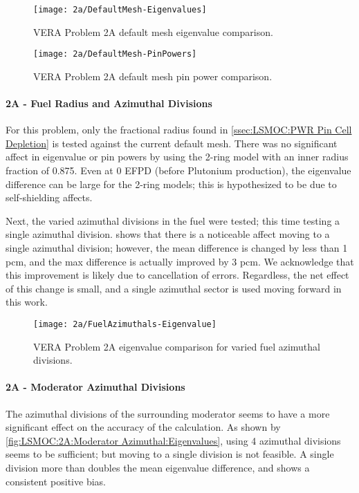 {{{{{          \begin{figure}
            \centering
            \texttt{[image: 2a/DefaultMesh-Eigenvalues]}
            \caption{VERA Problem 2A default mesh eigenvalue comparison. \label{fig:LSMOC:2A:Default Mesh:Eigenvalues}}
          \end{figure}
          \begin{figure}
            \centering
            \texttt{[image: 2a/DefaultMesh-PinPowers]}
            \caption{VERA Problem 2A default mesh pin power comparison. \label{fig:LSMOC:2A:Default Mesh:PinPowers}}
          \end{figure}
        }
        \paragraph{2A - Fuel Radius and Azimuthal Divisions}{
          For this problem, only the fractional radius found in \cref{ssec:LSMOC:PWR Pin Cell Depletion} is tested against the current default mesh.
          There was no significant affect in eigenvalue or pin powers by using the 2-ring model with an inner radius fraction of 0.875.
          Even at 0 \ac{EFPD} (before Plutonium production), the eigenvalue difference can be large for the 2-ring models; this is hypothesized to be due to self-shielding affects.

          Next, the varied azimuthal divisions in the fuel were tested; this time testing a single azimuthal division.
           shows that there is a noticeable affect moving to a single azimuthal division;
            however, the mean difference is changed by less than 1 \ac{pcm}, and the max difference is actually improved by 3 \ac{pcm}.
          We acknowledge that this improvement is likely due to cancellation of errors.
          Regardless, the net effect of this change is small, and a single azimuthal sector is used moving forward in this work.

          \begin{figure}
            \centering
            \texttt{[image: 2a/FuelAzimuthals-Eigenvalue]}
            \caption{VERA Problem 2A eigenvalue comparison for varied fuel azimuthal divisions. \label{fig:LSMOC:2A:Fuel Azimuthals:Eigenvalues}}
          \end{figure}
        }
        \paragraph{2A - Moderator Azimuthal Divisions}{
          The azimuthal divisions of the surrounding moderator seems to have a more significant effect on the accuracy of the calculation.
          As shown by \cref{fig:LSMOC:2A:Moderator Azimuthal:Eigenvalues}, using 4 azimuthal divisions seems to be sufficient; but moving to a single division is not feasible.
          A single division more than doubles the mean eigenvalue difference, and shows a consistent positive bias.

}}}}}
